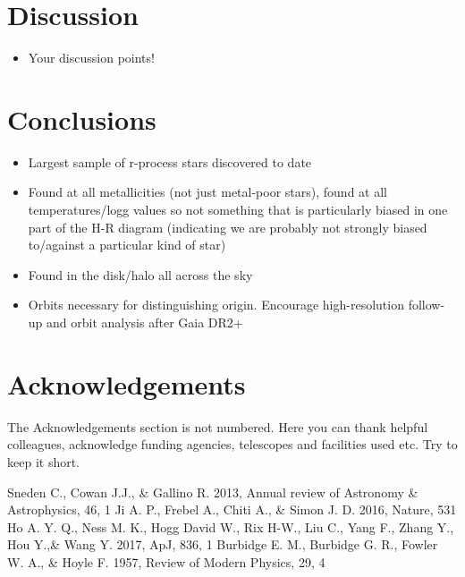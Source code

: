 \documentclass[a4paper,fleqn,usenatbib]{mnras}
\begin{document}
\section{Discussion}

\begin{itemize}
\item Your discussion points! 
\end{itemize}

\section{Conclusions}

\begin{itemize}
\item Largest sample of r-process stars discovered to date
\item Found at all metallicities (not just metal-poor stars), found at all temperatures/logg values so not something that is particularly biased in one part of the H-R diagram  (indicating we are probably not strongly biased to/against a particular kind of star)
\item Found in the disk/halo all across the sky
\item Orbits necessary for distinguishing origin. Encourage high-resolution follow-up and orbit analysis after Gaia DR2+
\end{itemize}

\section*{Acknowledgements}

The Acknowledgements section is not numbered. Here you can thank helpful
colleagues, acknowledge funding agencies, telescopes and facilities used etc.
Try to keep it short.




\begin{thebibliography}{99}
	Sneden C., Cowan J.J., \& Gallino R. 2013, Annual review of Astronomy \& Astrophysics, 46, 1
	Ji A. P., Frebel A., Chiti A., \& Simon J. D. 2016, Nature, 531
	Ho A. Y. Q., Ness M. K., Hogg David W., Rix H-W., Liu C., Yang F., Zhang Y., Hou Y.,\& Wang Y. 2017, ApJ, 836, 1
	Burbidge E. M., Burbidge G. R., Fowler W. A., \& Hoyle F. 1957, Review of Modern Physics, 29, 4
\end{thebibliography}
\end{document}
